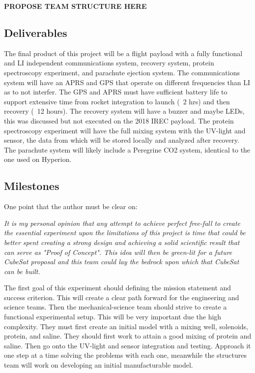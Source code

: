 \documentclass[conference]{IEEEtran} %
\begin{document}
\textbf{PROPOSE TEAM STRUCTURE HERE}

\subsection{Deliverables}
\label{subsec:deliverables}

  The final product of this project will be a flight payload with a fully functional and LI independent communications system, recovery system, protein spectroscopy experiment, and parachute ejection 
  system. The communications system will have an APRS and GPS that operate on different frequencies than LI as to not interfer. The GPS and APRS must have sufficient battery life 
  to support extensive time from rocket integration to launch (~2 hrs) and then recovery (~12 hours). The recovery system will have a buzzer and maybe LEDs, this was discussed 
  but not executed on the 2018 IREC payload. The protein spectroscopy experiment will have the full mixing system with the UV-light and sensor, the data from which will be stored 
  locally and analyzed after recovery. The parachute system will likely include a Peregrine CO2 system, identical to the one used on Hyperion. 

\subsection{Milestones}
\label{subsec:milestones}

  One point that the author must be clear on:

  \textit{It is my personal opinion that any attempt to achieve perfect free-fall to create the essential experiment upon the limitations of this project is time that 
  could be better spent creating a strong design and achieving a solid scientific result that can serve as "Proof of Concept". This idea will then be green-lit for a future 
  CubeSat proposal and this team could lay the bedrock upon which that CubeSat can be built.}

  The first goal of this experiment should defining the mission statement and success criterion. This will create a clear path forward for the engineering and science teams.
  Then the mechanical-science team should strive to create a functional experimental setup. This will be very important due the high complexity. They must first create an initial 
  model with a mixing well, solenoids, protein, and saline. They should first work to attain a good mixing of protein and saline. Then go onto the UV-light and sensor integration and testing. 
  Approach it one step at a time solving the problems with each one, meanwhile the structures team will work on developing an initial manufacturable model.
\end{document}
